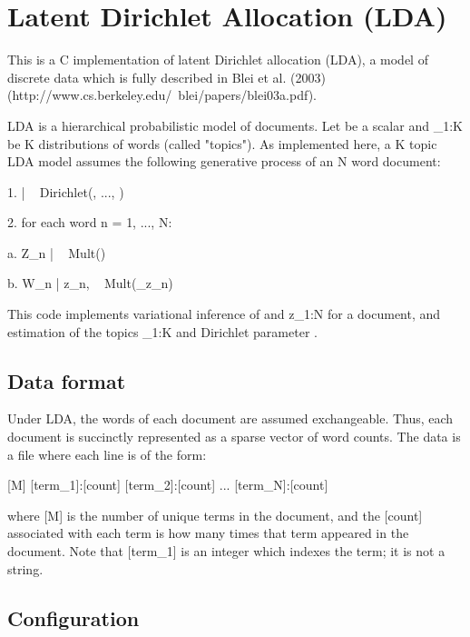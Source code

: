 
\section{Latent Dirichlet Allocation (LDA)}

This is a C implementation of latent Dirichlet allocation (LDA), a
model of discrete data which is fully described in Blei et al. (2003)
(http://www.cs.berkeley.edu/~blei/papers/blei03a.pdf).

LDA is a hierarchical probabilistic model of documents.  Let \alpha be
a scalar and \beta_{1:K} be K distributions of words (called "topics").
As implemented here, a K topic LDA model assumes the following
generative process of an N word document:

          1. \theta | \alpha ~ Dirichlet(\alpha, ..., \alpha)

          2. for each word n = {1, ..., N}:

             a. Z_n | \theta ~ Mult(\theta)

             b. W_n | z_n, \beta ~ Mult(\beta_{z_n})

This code implements variational inference of \theta and z_{1:N} for a
document, and estimation of the topics \beta_{1:K} and Dirichlet
parameter \alpha.


\subsection{Data format}

Under LDA, the words of each document are assumed exchangeable.  Thus,
each document is succinctly represented as a sparse vector of word
counts. The data is a file where each line is of the form:

     [M] [term_1]:[count] [term_2]:[count] ...  [term_N]:[count]

where [M] is the number of unique terms in the document, and the
[count] associated with each term is how many times that term appeared
in the document.  Note that [term_1] is an integer which indexes the
term; it is not a string.



\subsection{Configuration}

